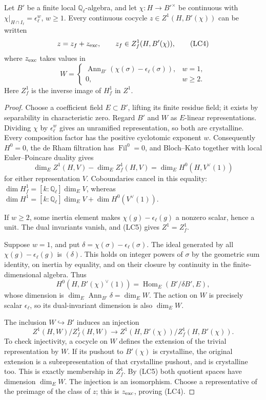 \begin{srlemma}\label{lem:sr-local-positive-annihilator}
Let \(B'\) be a finite local \(\mathbb Q_\ell\)-algebra,
and let \(\chi:H\to B'^\times\) be continuous with
\(\chi|_{H\cap I_\ell}=\epsilon_\ell^w\), \(w\ge1\).
Every continuous cocycle \(z\in Z^1(H,B'(\chi))\) can be
written
\[
                 z=z_f+z_{\rm exc},\qquad
 z_f\in Z^1_f(H,B'(\chi)),
 \tag{LC4}
\]
where \(z_{\rm exc}\) takes values in
\[
 W=\begin{cases}
 \operatorname{Ann}_{B'}
       (\chi(\sigma)-\epsilon_\ell(\sigma)),&w=1,\\
 0,&w\ge2.
 \end{cases}
\]
Here \(Z^1_f\) is the inverse image of \(H^1_f\) in \(Z^1\).
\end{srlemma}
\begin{proof}
Choose a coefficient field \(E\subset B'\), lifting its
finite residue field; it exists by separability in characteristic zero.
Regard \(B'\) and \(W\) as \(E\)-linear representations.
Dividing \(\chi\) by \(\epsilon_\ell^w\) gives an unramified
representation, so both are crystalline.
Every composition factor has the positive cyclotomic exponent \(w\).
Consequently \(H^0=0\), the de Rham filtration has
\(\operatorname{Fil}^0=0\), and Bloch--Kato together with
local Euler--Poincare duality gives
\[
 \dim_E Z^1(H,V)-\dim_E Z^1_f(H,V)
                       =\dim_E H^0(H,V^\vee(1))
 \tag{LC5}
\]
for either representation \(V\).
Coboundaries cancel in this equality:
\(\dim H^1_f=[k:\mathbb Q_\ell]\dim_E V\), whereas
\(\dim H^1=[k:\mathbb Q_\ell]\dim_E V+
                 \dim H^0(V^\vee(1))\).

If \(w\ge2\), some inertia element makes
\(\chi(g)-\epsilon_\ell(g)\) a nonzero scalar, hence a
unit.
The dual invariants vanish, and (LC5) gives \(Z^1=Z^1_f\).

Suppose \(w=1\), and put
\(\delta=\chi(\sigma)-\epsilon_\ell(\sigma)\).
The ideal generated by all
\(\chi(g)-\epsilon_\ell(g)\) is \((\delta)\).
This holds on integer powers of \(\sigma\) by the geometric
sum identity, on inertia by equality, and on their closure
by continuity in the finite-dimensional algebra.
Thus
\[
 H^0(H,B'(\chi)^\vee(1))
                         =\operatorname{Hom}_E(B'/\delta B',E),
\]
whose dimension is
\(\dim_E\operatorname{Ann}_{B'}\delta=\dim_EW\).
The action on \(W\) is precisely scalar \(\epsilon_\ell\),
so its dual-invariant dimension is also \(\dim_EW\).

The inclusion \(W\hookrightarrow B'\) induces an injection
\[
       Z^1(H,W)/Z^1_f(H,W)
             \longrightarrow Z^1(H,B'(\chi))/Z^1_f(H,B'(\chi)).
\]
To check injectivity, a cocycle on \(W\) defines the extension
of the trivial representation by \(W\).
If its pushout to \(B'(\chi)\) is crystalline, the original
extension is a subrepresentation of that crystalline
pushout, and is crystalline too.
This is exactly membership in \(Z^1_f\).
By (LC5) both quotient spaces have dimension \(\dim_EW\).
The injection is an isomorphism.
Choose a representative of the preimage of the class of \(z\);
this is \(z_{\rm exc}\), proving (LC4).
\end{proof}

